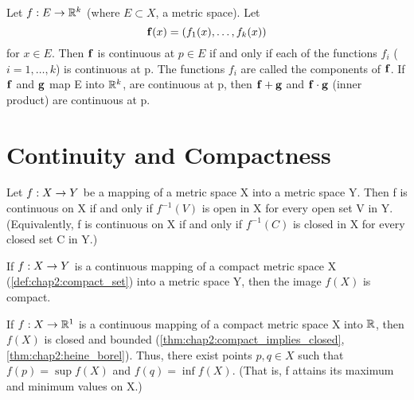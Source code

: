 
\begin{theorem} %
  \label{thm:chap4:cont_vector_coords}
  Let $f: E \to \mathbb{R}^k$ (where $E \subset X$, a metric space). Let
  \[ \mathbf{f}(x) = (f_1(x), \dots, f_k(x)) \]
  for $x \in E$. Then $\mathbf{f}$ is continuous at $p \in E$ if and
  only if each of the functions $f_i$ ($i=1,\dots,k$) is continuous at p.
  The functions $f_i$ are called the components of $\mathbf{f}$.
  If $\mathbf{f}$ and $\mathbf{g}$ map E into $\mathbb{R}^k$, are continuous at
  p, then $\mathbf{f}+\mathbf{g}$ and $\mathbf{f} \cdot \mathbf{g}$ (inner
  product) are continuous at p.
\end{theorem}

\section{Continuity and Compactness}
\label{sec:chap4:cont_compact}

\begin{theorem} %
  \label{thm:chap4:cont_open_closed_sets}
  Let $f: X \to Y$ be a mapping of a metric space X into a metric
  space Y. Then f is continuous on X if and only if $f^{-1}(V)$ is
  open in X for every open set V in Y.
  (Equivalently, f is continuous on X if and only if $f^{-1}(C)$ is
  closed in X for every closed set C in Y.)
\end{theorem}

\begin{theorem} %
  \label{thm:chap4:image_compact_is_compact}
  If $f: X \to Y$ is a continuous mapping of a compact metric
  space X (\autoref{def:chap2:compact_set}) into a metric space Y,
  then the image $f(X)$ is compact.
\end{theorem}

\begin{corollary} %
  \label{cor:chap4:extreme_value_thm}
  If $f: X \to \mathbb{R}^1$ is a continuous mapping of a compact metric
  space X into $\mathbb{R}$, then $f(X)$ is closed and bounded
  (\autoref{thm:chap2:compact_implies_closed},
  \autoref{thm:chap2:heine_borel}). Thus, there exist points $p, q
  \in X$ such that $f(p) = \sup f(X)$ and $f(q) = \inf f(X)$.
  (That is, f attains its maximum and minimum values on X.)
\end{corollary}

